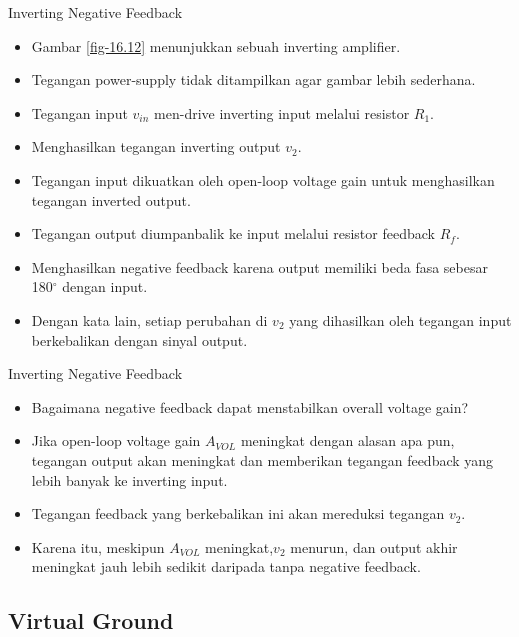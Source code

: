 \begin{frame}[t]{Inverting Negative Feedback}
	\begin{itemize}
		\item Gambar \ref{fig-16.12} menunjukkan sebuah inverting amplifier.
		\item Tegangan power-supply tidak ditampilkan agar gambar lebih sederhana.
		\item Tegangan input $ v_{in} $ men-drive inverting input melalui resistor $ R_1 $.
		\item Menghasilkan tegangan inverting output $ v_2 $.
		\item Tegangan input dikuatkan oleh open-loop voltage gain untuk menghasilkan tegangan inverted output.
		\item Tegangan output diumpanbalik ke input melalui resistor feedback $ R_f $.
		\item Menghasilkan negative feedback karena output memiliki beda fasa sebesar 180$ ^\circ $ dengan input.
		\item Dengan kata lain, setiap perubahan di $ v_2 $ yang dihasilkan oleh tegangan input berkebalikan dengan sinyal output.
	\end{itemize}
\end{frame}

\begin{frame}[t]{Inverting Negative Feedback}
	\begin{itemize}
		\item Bagaimana negative feedback dapat menstabilkan overall voltage gain?
		\item Jika open-loop voltage gain $ A_{VOL} $ meningkat dengan alasan apa pun, tegangan output akan meningkat dan memberikan tegangan feedback yang lebih banyak ke inverting input.
		\item Tegangan feedback yang berkebalikan ini akan mereduksi tegangan $ v_2 $.
		\item Karena itu, meskipun $ A_{VOL} $ meningkat,$ v_2 $ menurun, dan output akhir meningkat jauh lebih sedikit daripada tanpa negative feedback.
	\end{itemize}
\end{frame}

\subsection{Virtual Ground}

